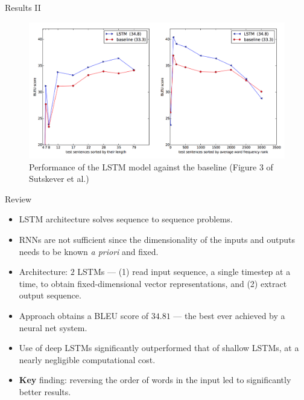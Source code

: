 \documentclass{beamer}
\begin{document}

\begin{frame}{Results II}

\begin{figure}[H]
  \centering
  \includegraphics[scale=0.42]{performance-results}
  \caption{Performance of the LSTM model against the baseline (Figure 3 of
    Sutskever et al.)}
\end{figure}

\end{frame}


\begin{frame}{Review}

\begin{itemize}
  \itemsep10pt
  \item LSTM architecture solves sequence to sequence problems.
  \item RNNs are not sufficient since the dimensionality of the inputs and
    outputs needs to be known \textit{a priori} and fixed.
  \item Architecture: $2$ LSTMs --- (1) read input sequence, a single timestep
    at a time, to obtain fixed-dimensional vector representations, and (2)
    extract output sequence.
  \item Approach obtains a BLEU score of $34.81$ --- the best ever achieved by a
    neural net system.
  \item Use of deep LSTMs significantly outperformed that of shallow LSTMs, at a
    nearly negligible computational cost.
  \item \textbf{Key} finding: reversing the order of words in the input led to
    significantly better results.
\end{itemize}

\end{frame}
\end{document}
